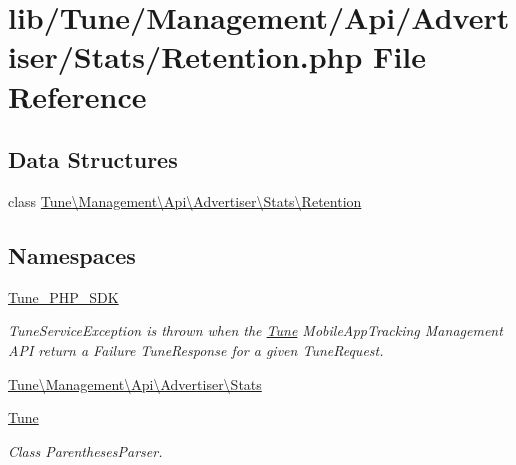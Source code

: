 \hypertarget{Retention_8php}{\section{lib/\-Tune/\-Management/\-Api/\-Advertiser/\-Stats/\-Retention.php File Reference}
\label{Retention_8php}
}
\subsection*{Data Structures}
\begin{DoxyCompactItemize}
\item 
class \hyperlink{classTune_1_1Management_1_1Api_1_1Advertiser_1_1Stats_1_1Retention}{Tune\textbackslash{}\-Management\textbackslash{}\-Api\textbackslash{}\-Advertiser\textbackslash{}\-Stats\textbackslash{}\-Retention}
\end{DoxyCompactItemize}
\subsection*{Namespaces}
\begin{DoxyCompactItemize}
\item 
\hyperlink{namespaceTune__PHP__SDK}{Tune\-\_\-\-P\-H\-P\-\_\-\-S\-D\-K}
\begin{DoxyCompactList}\small\item\em Tune\-Service\-Exception is thrown when the \hyperlink{namespaceTune}{Tune} Mobile\-App\-Tracking Management A\-P\-I return a Failure Tune\-Response for a given Tune\-Request. \end{DoxyCompactList}\item 
\hyperlink{namespaceTune_1_1Management_1_1Api_1_1Advertiser_1_1Stats}{Tune\textbackslash{}\-Management\textbackslash{}\-Api\textbackslash{}\-Advertiser\textbackslash{}\-Stats}
\item 
\hyperlink{namespaceTune}{Tune}
\begin{DoxyCompactList}\small\item\em Class Parentheses\-Parser. \end{DoxyCompactList}\end{DoxyCompactItemize}
